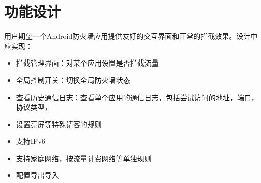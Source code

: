 \documentclass{article}
\begin{document}
\section{功能设计}

用户期望一个Android防火墙应用提供友好的交互界面和正常的拦截效果。设计中应实现：
\begin{itemize}
    \item 拦截管理界面：对某个应用设置是否拦截流量
    \item 全局控制开关：切换全局防火墙状态
    \item 查看历史通信日志：查看单个应用的通信日志，包括尝试访问的地址，端口，协议类型，
    \item 设置亮屏等特殊请客的规则
    \item 支持IPv6
    \item 支持家庭网络，按流量计费网络等单独规则
    \item 配置导出导入
\end{itemize}
\end{document}
